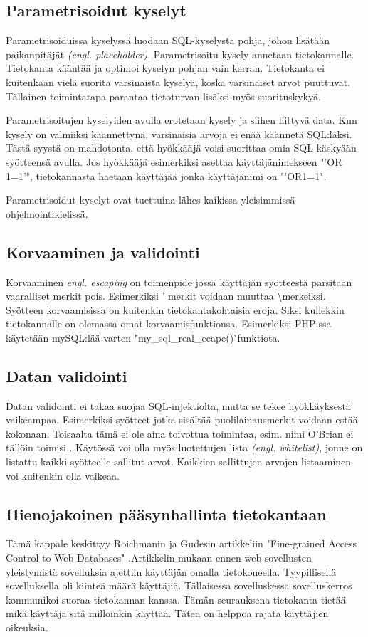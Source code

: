 \documentclass[finnish]{tktltiki2}
\theoremstyle{definition}
\theoremstyle{remark}
\begin{document}
		\subsection{Parametrisoidut kyselyt}
		Parametrisoiduissa kyselyssä luodaan SQL-kyselystä pohja, johon lisätään paikanpitäjät \textit{(engl. placeholder)}. Parametrisoitu kysely annetaan tietokannalle. Tietokanta kääntää ja optimoi kyselyn pohjan vain kerran. Tietokanta ei kuitenkaan vielä suorita varsinaista kyselyä, koska varsinaiset arvot puuttuvat. Tällainen toimintatapa parantaa tietoturvan lisäksi myös suorituskykyä.
		
		Parametrisoitujen kyselyiden avulla erotetaan kysely ja siihen liittyvä data. Kun kysely on valmiiksi käännettynä, varsinaisia arvoja ei enää käännetä SQL:läksi. Tästä syystä on mahdotonta, että hyökkääjä voisi suorittaa omia SQL-käskyään syötteensä avulla. Jos hyökkääjä esimerkiksi asettaa käyttäjänimekseen "'OR 1=1'", tietokannasta haetaan käyttäjää jonka käyttäjänimi on "'OR1=1".
		
		Parametrisoidut kyselyt ovat tuettuina lähes kaikissa yleisimmissä ohjelmointikielissä.
		
		\subsection{Korvaaminen ja validointi}
		Korvaaminen \textit{engl. escaping} on toimenpide jossa käyttäjän syötteestä parsitaan vaaralliset merkit pois. Esimerkiksi ' merkit voidaan muuttaa \textbackslash merkeiksi. Syötteen korvaamisissa on kuitenkin tietokantakohtaisia eroja. Siksi kullekkin tietokannalle on olemassa omat korvaamisfunktionsa. Esimerkiksi PHP:ssa käytetään mySQL:lää varten "my{\_}sql{\_}real{\_}ecape()"\space funktiota.
		
		\subsection{Datan validointi}
		Datan validointi ei takaa suojaa SQL-injektiolta, mutta se tekee hyökkäyksestä vaikeampaa. Esimerkiksi syötteet jotka sisältää puolilainausmerkit voidaan estää kokonaan. Toisaalta tämä ei ole aina toivottua toimintaa, esim. nimi O'Brian ei tällöin toimisi \cite{validointi}. 
		Käytössä voi olla myös luotettujen lista \textit{(engl. whitelist)}, jonne on listattu kaikki syötteelle sallitut arvot. Kaikkien sallittujen arvojen listaaminen voi kuitenkin olla vaikeaa.
		
		\subsection{Hienojakoinen pääsynhallinta tietokantaan}
		Tämä kappale keskittyy Roichmanin ja Gudesin artikkeliin "Fine-grained Access Control to Web Databases" \cite{access}.\space Artikkelin mukaan ennen web-sovellusten yleistymistä sovelluksia ajettiin käyttäjän omalla tietokoneella. Tyypillisellä sovelluksella oli kiinteä määrä  käyttäjiä. Tällaisessa sovelluskessa sovelluskerros kommunikoi suoraa tietokannan kanssa. Tämän seurauksena tietokanta tietää mikä käyttäjä sitä milloinkin käyttää. Täten on helppoa rajata käyttäjien oikeuksia.
		
\end{document}
